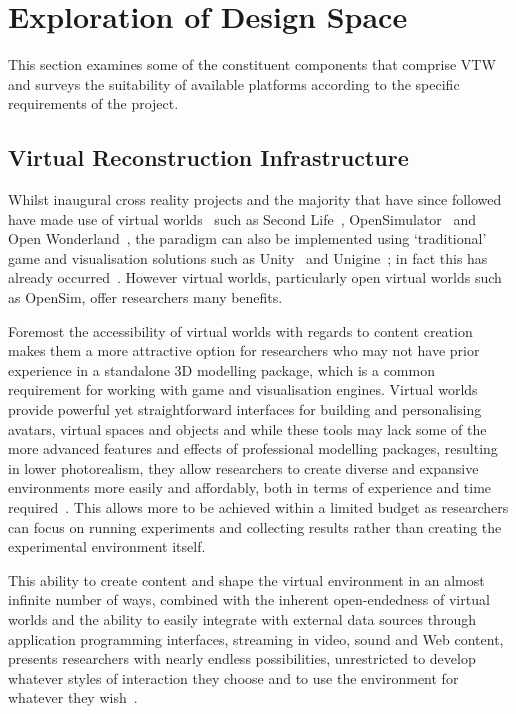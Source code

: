 \documentclass[conference,a4paper]{IEEEtran}
\begin{document}
\section{Exploration of Design Space}
\label{sec:survey}
This section examines some of the constituent components that comprise VTW and surveys the suitability of available platforms according to the specific requirements of the project.

\subsection{Virtual Reconstruction Infrastructure}
\label{subsecvirtualreconstructioninfrastructure}
Whilst inaugural cross reality projects and the majority that have since followed have made use of virtual worlds~\cite{Sivan2009} such as Second Life~\cite{LindenResearchInc.}, OpenSimulator~\cite{OpenSimulatorProject} and Open Wonderland~\cite{OpenWonderlandFoundation}, the paradigm can also be implemented using `traditional' game and visualisation solutions such as Unity~\cite{UnityTechnologies} and Unigine~\cite{UnigineCorp}; in fact this has already occurred~\cite{mit:doppel}. However virtual worlds, particularly open virtual worlds such as OpenSim, offer researchers many benefits.

Foremost the accessibility of virtual worlds with regards to content creation makes them a more attractive option for researchers who may not have prior experience in a standalone 3D modelling package, which is a common requirement for working with game and visualisation engines. Virtual worlds provide powerful yet straightforward interfaces for building and personalising avatars, virtual spaces and objects and while these tools may lack some of the more advanced features and effects of professional modelling packages, resulting in lower photorealism, they allow researchers to create diverse and expansive environments more easily and affordably, both in terms of experience and time required~\cite{Hendaoui2008}. This allows more to be achieved within a limited budget as researchers can focus on running experiments and collecting results rather than creating the experimental environment itself.

This ability to create content and shape the virtual environment in an almost infinite number of ways, combined with the inherent open-endedness of virtual worlds and the ability to easily integrate with external data sources through application programming interfaces, streaming in video, sound and Web content, presents researchers with nearly endless possibilities, unrestricted to develop whatever styles of interaction they choose and to use the environment for whatever they wish~\cite{Warburton2009}.
\end{document}
